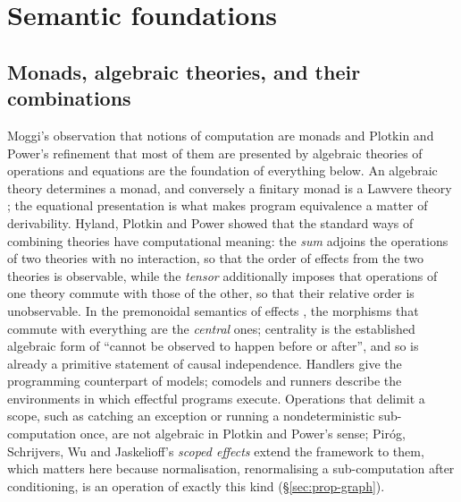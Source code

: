 
\section{Semantic foundations}\label{sec:foundations}

\subsection{Monads, algebraic theories, and their combinations}

Moggi's observation that notions of computation are monads \cite{MOGGI199155,moggi1991monadicmetalanguage} and Plotkin and Power's refinement that most of them are presented by algebraic theories of operations and equations \cite{plotkin_power_2002,PlotkinPower04CompEffectsOverview} are the foundation of everything below. An algebraic theory determines a monad, and conversely a finitary monad is a Lawvere theory \cite{lawveretheories_monads_HYLAND2007437}; the equational presentation is what makes program equivalence a matter of derivability. Hyland, Plotkin and Power \cite{sums_tensors_HYLAND200670} showed that the standard ways of combining theories have computational meaning: the \emph{sum} adjoins the operations of two theories with no interaction, so that the order of effects from the two theories is observable, while the \emph{tensor} additionally imposes that operations of one theory commute with those of the other, so that their relative order is unobservable. In the premonoidal semantics of effects \cite{PowerRobinson97premonoidal,fuhrmann1999premonoidal}, the morphisms that commute with everything are the \emph{central} ones; centrality is the established algebraic form of ``cannot be observed to happen before or after'', and so is already a primitive statement of causal independence. Handlers \cite{bauer2019algebraicalgebraiceffectshandlers} give the programming counterpart of models; comodels and runners \cite{model_comodel_PLOTKIN2008295,runners_10.1007/978-3-030-44914-8_2} describe the environments in which effectful programs execute. Operations that delimit a scope, such as catching an exception or running a nondeterministic sub-computation once, are not algebraic in Plotkin and Power's sense; Piróg, Schrijvers, Wu and Jaskelioff's \emph{scoped effects} \cite{pirog2018scoped} extend the framework to them, which matters here because normalisation, renormalising a sub-computation after conditioning, is an operation of exactly this kind (\S\ref{sec:prop-graph}).

